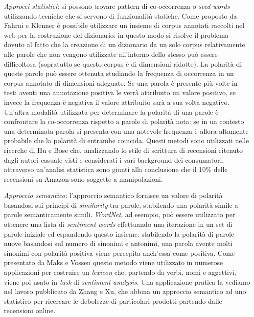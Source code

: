 \documentclass[a4paper,12pt,openright,twoside]{report}
\theoremstyle{definition}
\begin{document}
\emph{Approcci statistici}: si possono trovare pattern di co-occorrenza o \emph{seed words}
utilizzando tecniche che si servono di funzionalità statiche.
Come proposto da Fahrni e Klenner %
è possibile utilizzare un insieme di corpus annotati raccolti nel web per la costruzione
del dizionario: in questo modo si risolve il problema dovuto al fatto che la creazione di un dizionario
da un solo corpus relativamente alle parole che non vengono utilizzate
all'interno dello stesso può essere difficoltosa (sopratutto se questo corpus è di dimensioni ridotte).
La polarità di queste parole può essere ottenuta studiando la frequenza di occorrenza in 
un corpus annotato di dimensioni adeguate. Se una parola è presente più volte in testi aventi una annotazione
positiva le verrà attribuito un valore positivo, se invece la frequenza è negativa il valore
attribuito sarà a sua volta negativo. Un'altra modalità utilizzata per determinare la polarità di una parole
è confrontare la co-occorrenza rispetto a parole di polarità nota:
se in un contesto una determinata parola si presenta con 
una notevole frequenza è allora altamente probabile che la polarità di entrambe coincida. 
Questi metodi sono utilizzati nelle ricerche di Hu e Bose %
che, analizzando lo stile di scrittura di recensioni ritenuto dagli autori casuale visti e considerati 
i vari background dei consumatori, attraverso un'analisi statistica sono giunti alla conclusione
che il 10\% delle recensioni su Amazon sono soggette a manipolazioni.

\emph{Approccio semantico:} l'approccio semantico fornisce un valore di polarità basandosi sui principi
di \emph{similarity} tra parole, stabilendo una polarità simile a parole semanticamente simili.
\emph{WordNet}, ad esempio, può essere utilizzato per ottenere una lista di \emph{sentiment words} effettuando una 
iterazione in un set di parole iniziale ed espandendo questo insieme: stabilendo la polarità di parole
nuove basandosi sul numero di sinonimi e antonimi, una parola avente molti sinonimi
con polarità positiva viene percepita anch'essa come positiva.
Come presentato da Maks e Vossen %
questo metodo viene utilizzato in numerose applicazioni per costruire un \emph{lexicon} che, partendo da verbi,
nomi e aggettivi, viene poi usato in \emph{task} di \emph{sentiment analysis}. Una applicazione pratica la vediamo nel lavoro
pubblicato da Zhang e Xu, %
che abbina un approccio semantico ad uno statistico per ricercare le debolezze di particolari prodotti
partendo dalle recensioni online.
\end{document}
